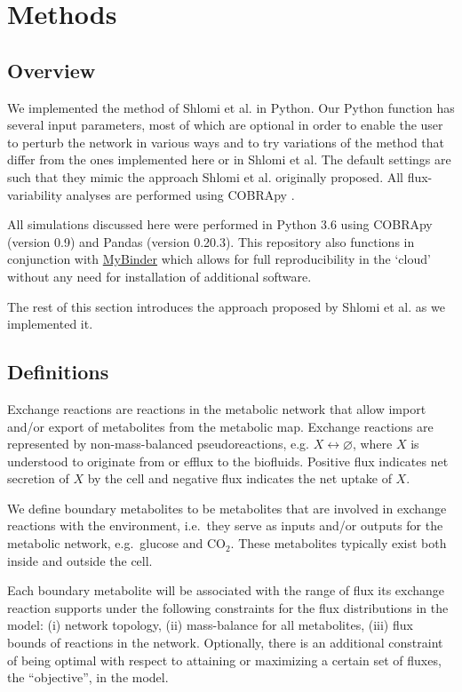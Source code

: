 \documentclass[10pt,a4paper,onecolumn]{article}
\begin{document}
\section{Methods}\label{methods}

\subsection{Overview}\label{overview}

We implemented the method of Shlomi et al. in Python. Our Python
function has several input parameters, most of which are optional in
order to enable the user to perturb the network in various ways and to
try variations of the method that differ from the ones implemented here
or in Shlomi et al. The default settings are such that they mimic the
approach Shlomi et al. originally proposed. All flux-variability
analyses are performed using COBRApy \autocite{Ebrahim2013}.

All simulations discussed here were performed in Python 3.6 using
COBRApy \autocite{Ebrahim2013} (version 0.9) and Pandas (version
0.20.3). This repository also functions in conjunction with
\href{http://mybinder.org}{MyBinder} which allows for full
reproducibility in the `cloud' without any need for installation of
additional software.

The rest of this section introduces the approach proposed by Shlomi et
al. as we implemented it.

\subsection{Definitions}\label{definitions}

Exchange reactions are reactions in the metabolic network that allow
import and/or export of metabolites from the metabolic map. Exchange
reactions are represented by non-mass-balanced pseudoreactions, e.g.
\(X \leftrightarrow \varnothing\), where \(X\) is understood to
originate from or efflux to the biofluids. Positive flux indicates net
secretion of \(X\) by the cell and negative flux indicates the net
uptake of \(X\).

We define boundary metabolites to be metabolites that are involved in
exchange reactions with the environment, i.e.~they serve as inputs
and/or outputs for the metabolic network, e.g.~glucose and CO\(_2\).
These metabolites typically exist both inside and outside the cell.

Each boundary metabolite will be associated with the range of flux its
exchange reaction supports under the following constraints for the flux
distributions in the model: (i) network topology, (ii) mass-balance for
all metabolites, (iii) flux bounds of reactions in the network.
Optionally, there is an additional constraint of being optimal with
respect to attaining or maximizing a certain set of fluxes, the
``objective'', in the model.
\end{document}
